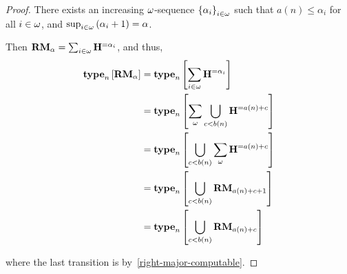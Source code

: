 \begin{proof}
    There exists an increasing $\omega$-sequence $\left\{ {\alpha_i} \right\}_{i \in \omega}$ such that
    $a(n) \le \alpha_i$ for all $i \in \omega$,
    and $\sup_{i \in \omega} \left( {\alpha_i + 1} \right) = \alpha$.

    Then $\mathbf{RM}_{\alpha} = \sum_{i \in \omega} \mathbf{H}_{}^{= \alpha_i}$,
    and thus,
    \begin{align*}
        \mathbf{type}_{n} \left[ {\mathbf{RM}_{\alpha}} \right]
         & = \mathbf{type}_{n} \left[ {\sum_{i \in \omega} \mathbf{H}_{}^{= \alpha_i}} \right]               \\
         & = \mathbf{type}_{n} \left[ {\sum_{\omega} \bigcup_{c < b(n)}{\mathbf{H}_{}^{= a(n) + c}}} \right] \\
         & = \mathbf{type}_{n} \left[ {\bigcup_{c < b(n)}{\sum_{\omega} \mathbf{H}_{}^{= a(n) + c}}} \right] \\
         & = \mathbf{type}_{n} \left[ {\bigcup_{c < b(n)}{\mathbf{RM}_{a(n) + c + 1}}} \right]         \\
         & = \mathbf{type}_{n} \left[ {\bigcup_{c < b(n)}{\mathbf{RM}_{a(n) + c}}} \right]             \\
    \end{align*}

    where the last transition is by~\cref{right-major-computable}.
\end{proof}
